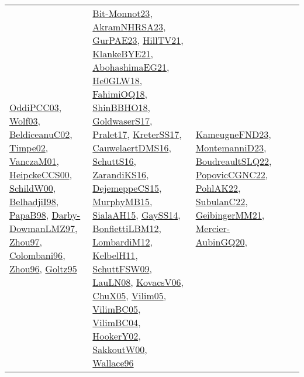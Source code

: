 {\begin{longtable}{llp{6cm}p{6cm}p{6cm}}
\href{papers/OddiPCC03.pdf}{OddiPCC03}\cite{OddiPCC03}, \href{papers/Wolf03.pdf}{Wolf03}\cite{Wolf03}, \href{papers/BeldiceanuC02.pdf}{BeldiceanuC02}\cite{BeldiceanuC02}, \href{articles/Timpe02.pdf}{Timpe02}\cite{Timpe02}, \href{papers/VanczaM01.pdf}{VanczaM01}\cite{VanczaM01}, \href{articles/HeipckeCCS00.pdf}{HeipckeCCS00}\cite{HeipckeCCS00}, \href{articles/SchildW00.pdf}{SchildW00}\cite{SchildW00}, \href{articles/BelhadjiI98.pdf}{BelhadjiI98}\cite{BelhadjiI98}, \href{articles/PapaB98.pdf}{PapaB98}\cite{PapaB98}, \href{articles/Darby-DowmanLMZ97.pdf}{Darby-DowmanLMZ97}\cite{Darby-DowmanLMZ97}, \href{articles/Zhou97.pdf}{Zhou97}\cite{Zhou97}, \href{papers/Colombani96.pdf}{Colombani96}\cite{Colombani96}, \href{papers/Zhou96.pdf}{Zhou96}\cite{Zhou96}, \href{papers/Goltz95.pdf}{Goltz95}\cite{Goltz95} & \href{papers/Bit-Monnot23.pdf}{Bit-Monnot23}\cite{Bit-Monnot23}, \href{articles/AkramNHRSA23.pdf}{AkramNHRSA23}\cite{AkramNHRSA23}, \href{articles/GurPAE23.pdf}{GurPAE23}\cite{GurPAE23}, \href{papers/HillTV21.pdf}{HillTV21}\cite{HillTV21}, \href{papers/KlankeBYE21.pdf}{KlankeBYE21}\cite{KlankeBYE21}, \href{articles/AbohashimaEG21.pdf}{AbohashimaEG21}\cite{AbohashimaEG21}, \href{papers/He0GLW18.pdf}{He0GLW18}\cite{He0GLW18}, \href{articles/FahimiOQ18.pdf}{FahimiOQ18}\cite{FahimiOQ18}, \href{articles/ShinBBHO18.pdf}{ShinBBHO18}\cite{ShinBBHO18}, \href{papers/GoldwaserS17.pdf}{GoldwaserS17}\cite{GoldwaserS17}, \href{papers/Pralet17.pdf}{Pralet17}\cite{Pralet17}, \href{articles/KreterSS17.pdf}{KreterSS17}\cite{KreterSS17}, \href{papers/CauwelaertDMS16.pdf}{CauwelaertDMS16}\cite{CauwelaertDMS16}, \href{papers/SchuttS16.pdf}{SchuttS16}\cite{SchuttS16}, \href{articles/ZarandiKS16.pdf}{ZarandiKS16}\cite{ZarandiKS16}, \href{papers/DejemeppeCS15.pdf}{DejemeppeCS15}\cite{DejemeppeCS15}, \href{papers/MurphyMB15.pdf}{MurphyMB15}\cite{MurphyMB15}, \href{papers/SialaAH15.pdf}{SialaAH15}\cite{SialaAH15}, \href{papers/GaySS14.pdf}{GaySS14}\cite{GaySS14}, \href{papers/BonfiettiLBM12.pdf}{BonfiettiLBM12}\cite{BonfiettiLBM12}, \href{articles/LombardiM12.pdf}{LombardiM12}\cite{LombardiM12}, \href{articles/KelbelH11.pdf}{KelbelH11}\cite{KelbelH11}, \href{papers/SchuttFSW09.pdf}{SchuttFSW09}\cite{SchuttFSW09}, \href{papers/LauLN08.pdf}{LauLN08}\cite{LauLN08}, \href{papers/KovacsV06.pdf}{KovacsV06}\cite{KovacsV06}, \href{papers/ChuX05.pdf}{ChuX05}\cite{ChuX05}, \href{papers/Vilim05.pdf}{Vilim05}\cite{Vilim05}, \href{articles/VilimBC05.pdf}{VilimBC05}\cite{VilimBC05}, \href{papers/VilimBC04.pdf}{VilimBC04}\cite{VilimBC04}, \href{papers/HookerY02.pdf}{HookerY02}\cite{HookerY02}, \href{articles/SakkoutW00.pdf}{SakkoutW00}\cite{SakkoutW00}, \href{articles/Wallace96.pdf}{Wallace96}\cite{Wallace96} & \href{papers/KameugneFND23.pdf}{KameugneFND23}\cite{KameugneFND23}, \href{articles/MontemanniD23.pdf}{MontemanniD23}\cite{MontemanniD23}, \href{papers/BoudreaultSLQ22.pdf}{BoudreaultSLQ22}\cite{BoudreaultSLQ22}, \href{papers/PopovicCGNC22.pdf}{PopovicCGNC22}\cite{PopovicCGNC22}, \href{articles/PohlAK22.pdf}{PohlAK22}\cite{PohlAK22}, \href{articles/SubulanC22.pdf}{SubulanC22}\cite{SubulanC22}, \href{papers/GeibingerMM21.pdf}{GeibingerMM21}\cite{GeibingerMM21}, \href{papers/Mercier-AubinGQ20.pdf}{Mercier-AubinGQ20}\cite{Mercier-AubinGQ20}, 
\end{longtable}}
